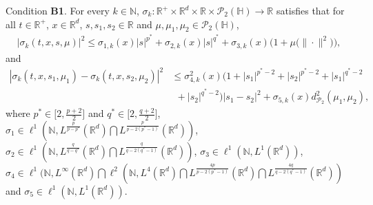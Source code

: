 \documentclass[11pt]{article}
\renewcommand{\leq}{\leqslant}
\numberwithin{equation}{section}
\begin{document}
Condition \textbf{B1}. For every $k\in \mathbb{N}$,
$\sigma_k:\mathbb{R}^+\times \mathbb{R}^d\times\mathbb{R}\times
\mathcal{P}_2(\mathbb{H})\rightarrow \mathbb{R}$ satisfies that for
  all $t\in\mathbb{R}^+$,
$x\in\mathbb{R}^d$, $s,s_1,s_2\in\mathbb{R}$ and $\mu,\mu_1,\mu_2
\in\mathcal{P}_2(\mathbb{H})$,
\begin{align}\label{h2new}
|\sigma_k(t,x,s,\mu)|^2\leq \sigma_{1,k}(x)
|s|^{p^*}+\sigma_{2,k}(x)
|s|^{q^*}
+\sigma_{3,k}(x)\big(1+\mu\big(\|\cdot\|^2\big)\big),
\end{align}
and
\begin{align}\label{h2anew}
|\sigma_k(t,x,s_1,\mu_1)-\sigma_k(t,x,s_2,\mu_2)
|^2&\leq
\sigma^2_{4,k}(x)\big( 1+ |s_1|^{p^*-2}+ |s_2|^{p^*-2} +|s_1|^{q^*-2}
\nonumber\\&\ \ +|s_2|^{q^*-2}
\big)|s_1-s_2|^2 +\sigma_{5,k}(x)
d_{\mathcal{P}_2}^2(\mu_1,\mu_2),
\end{align}
where $p^*\in\big[2,\frac{p+2}{2}\big]$ and $q^*\in\big[2,\frac{q+2}{2}\big]$,
$\sigma_1
 \in
 \ell^{1}
 (\mathbb{N},
 L^{\frac{p}{p-p^*}}(\mathbb{R}^d)
 \bigcap
 L^{{\frac{p}{p-2(p^*-1)}}}(\mathbb{R}^d))$,
$\sigma_2
 \in
 \ell^{1}
 (\mathbb{N},L^{\frac{q}{q-q^*}}
 (\mathbb{R}^d)\bigcap
 L^{{\frac{q}{q-2(q^*-1)}}}(\mathbb{R}^d))$, $\sigma_3
 \in
 \ell^{1}
 (\mathbb{N},L^1(\mathbb{R}^d))$, $\sigma_4\in \ell^{1}
 (\mathbb{N},
 L^{\infty}(\mathbb{R}^d)
 \bigcap
 \ell^2
 (\mathbb{N},L^4(\mathbb{R}^d)
 \bigcap
 L^{{\frac{4p}{p-2(p^*-1)}}}
 (\mathbb{R}^d)\bigcap
 L^{{\frac{4q}{q-2(q^*-1)}}}
 (\mathbb{R}^d))$ and $\sigma_5
 \in
 \ell^{1}
 (\mathbb{N},L^{1}(\mathbb{R}^d))$.
\end{document}
